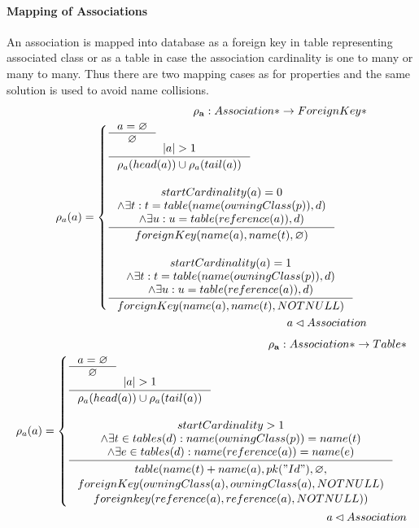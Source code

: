 \documentclass[11pt]{article}
\begin{document}
\paragraph{Mapping of Associations} An association is mapped into database as a foreign key in table representing associated class or as a table in case the association cardinality is one to many or many to many. Thus there are two mapping cases as for properties and the same solution is used to avoid name collisions.
\begin{align*}
	\mathbf{\rho_a} : Association* \rightarrow ForeignKey* \\
	\rho_a(a) = \begin{cases}
		\inference{a = \varnothing}{\varnothing}\\
		\inference{|a| > 1}{\rho_{a}(head(a)) \cup \rho_{a}(tail(a))}\\\\
		\inference{ startCardinality(a) = 0 \\ \wedge \exists t : t = table(name(owningClass(p)), d) \\ \wedge \exists u : u = table(reference(a)), d)
		}{
			foreignKey(name(a), name(t),  \varnothing) 
	 	}
  \\ \\
 	 \inference{ startCardinality(a) = 1 \\ \wedge \exists t : t = table(name(owningClass(p)), d) \\ \wedge \exists u : u = table(reference(a)), d)
 	 }{ 
		foreignKey(name(a), name(t),  NOTNULL)
	}
	 \end{cases}\\
	 a \lhd Association
\end{align*}
\begin{align*} 
	\mathbf{\rho_a} : Association* \rightarrow Table* \\
	\rho_a(a) = \begin{cases}
 		\inference{a = \varnothing}{\varnothing}\\
		\inference{|a| > 1}{\rho_{a}(head(a)) \cup \rho_{a}(tail(a))}\\\\
		\inference{  startCardinality > 1 \\ \wedge \exists t \in tables(d) : name(owningClass(p)) = name(t) \\ \wedge \exists e \in tables(d) : name(reference(a)) = name(e)
  		}{\begin{gathered}  
		 table(name(t)+name(a), pk("Id"), \varnothing, \\ foreignKey(owningClass(a),owningClass(a), NOTNULL) \\ foreignkey(reference(a), reference(a), NOTNULL)) 
  		\end{gathered}}  
 	\end{cases}\\
	 a \lhd Association
\end{align*}
\end{document}
